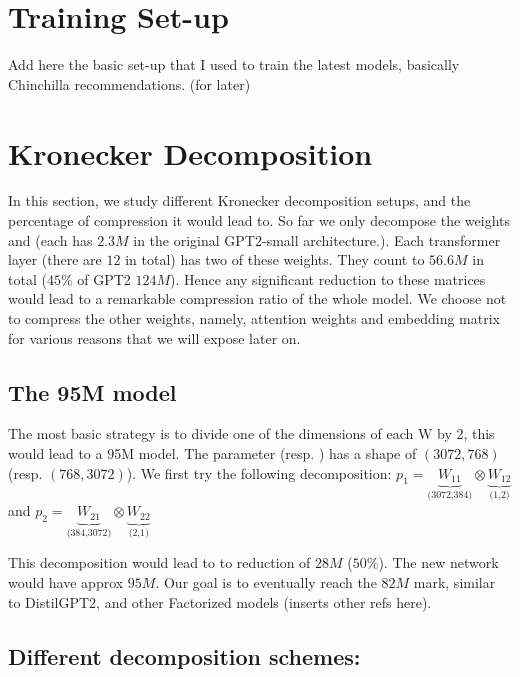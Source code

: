 \documentclass{article}
\begin{document}
\section{Training Set-up}%
\label{sec:Training setups}

Add here the basic set-up that I used to train the latest models, basically Chinchilla recommendations. (for later)

\section{Kronecker Decomposition}%
\label{sub:Kronecker Decomposition}

In this section, we study different Kronecker decomposition setups, and the percentage of compression it would  lead to. So far we only decompose the weights  and  (each has $2.3M$ in the original GPT2-small architecture.). Each transformer layer (there are $12$ in total) has two of these weights. They count to $56.6M$ in total ($45\%$ of GPT2 $124M$). Hence any significant reduction to these matrices would lead to a remarkable compression ratio of the whole model. We choose not to compress the other weights, namely, attention weights and embedding matrix for various reasons that we will expose later on. 

\subsection{The 95M model}%
\label{sub:The 95M model}
The most basic strategy is to divide one of the dimensions of each W by 2, this would lead to a 95M model. The parameter  (resp. ) has a shape of $(3072, 768)$ (resp.  $(768, 3072)$). We first try the following decomposition: $p_1 = \underbrace{W_{11}}_{\text{(3072,384)}} \otimes \underbrace{W_{12}}_{\text{(1,2)}}$  and $p_2 = \underbrace{W_{21}}_{\text{(384,3072)}} \otimes \underbrace{W_{22}}_{\text{(2,1)}}$  


This decomposition would lead to to reduction of $28M$ ($50\%$). The new network would have approx $95M$. Our goal is to eventually reach the $82M$ mark, similar to DistilGPT2, and other Factorized models (inserts other refs here).

\subsection{Different decomposition schemes:}%
\label{sec:Different decomposition schemes}
\end{document}
